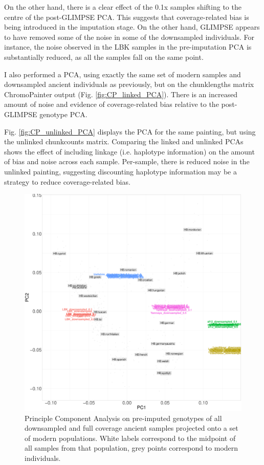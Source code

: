 On the other hand, there is a clear effect of the 0.1x samples shifting to the centre of the post-GLIMPSE PCA. This suggests that coverage-related bias is being introduced in the imputation stage. On the other hand, GLIMPSE appears to have removed some of the noise in some of the downsampled individuals. For instance, the noise observed in the LBK samples in the pre-imputation PCA is substantially reduced, as all the samples fall on the same point. 

I also performed a PCA, using exactly the same set of modern samples and downsampled ancient individuals as previously, but on the chunklengths matrix ChromoPainter output (Fig. \ref{fig:CP_linked_PCA}). There is an increased amount of noise  and evidence of coverage-related bias relative to the post-GLIMPSE genotype PCA.

Fig. \ref{fig:CP_unlinked_PCA} displays the PCA for the same painting, but using the unlinked chunkcounts matrix. Comparing the linked and unlinked PCAs shows the effect of including linkage (i.e. haplotype information) on the amount of bias and noise across each sample. Per-sample, there is reduced noise in the unlinked painting, suggesting discounting haplotype information may be a strategy to reduce coverage-related bias.

\begin{figure}[htp]
    \centering
    \includegraphics[width=1.0\textwidth]{../images/chapter1/pre_GLIMPSE_PCA.pdf}
    \caption{Principle Component Analysis on pre-imputed genotypes of all downsampled and full coverage ancient samples projected onto a set of modern populations. White labels correspond to the midpoint of all samples from that population, grey points correspond to modern individuals.}
    \label{fig:pre_GLIMPSE_PCA}
\end{figure}

